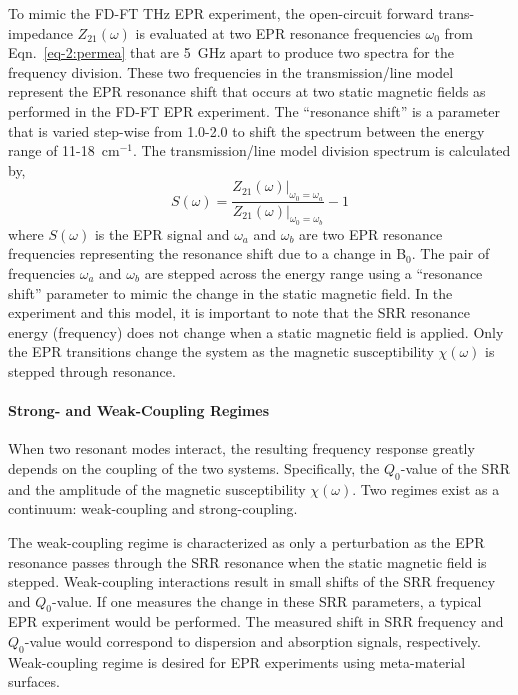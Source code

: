 To mimic the FD-FT THz EPR experiment, the open-circuit forward trans-impedance $Z_{21}(\omega)$ is evaluated at two EPR resonance frequencies $\omega_0$ from Eqn.~\ref{eq-2:permea} that are 5~GHz apart to produce two spectra for the frequency division. These two frequencies in the transmission\-/line model represent the EPR resonance shift that occurs at two static magnetic fields as performed in the FD-FT EPR experiment. The ``resonance shift'' is a parameter that is varied step-wise from 1.0-2.0 to shift the spectrum between the energy range of 11-18~cm$^{-1}$. The transmission\-/line model division spectrum is calculated by, 
\begin{equation}
    S(\omega) = \frac{Z_{21}(\omega)\Bigr\rvert_{\omega_0 = \omega_a}}{Z_{21}(\omega)\Bigr\rvert_{\omega_0 = \omega_b}} - 1
\end{equation}
where $S(\omega)$ is the EPR signal and $\omega_a$ and $\omega_b$ are two EPR resonance frequencies representing the resonance shift due to a change in B$_0$. The pair of frequencies $\omega_a$ and $\omega_b$ are stepped across the energy range using a ``resonance shift'' parameter to mimic the change in the static magnetic field. In the experiment and this model, it is important to note that the SRR resonance energy (frequency) does not change when a static magnetic field is applied. Only the EPR transitions change the system as the magnetic susceptibility $\chi(\omega)$ is stepped through resonance.

\noindent \paragraph*{Strong- and Weak-Coupling Regimes}
When two resonant modes interact, the resulting frequency response greatly depends on the coupling of the two systems. Specifically, the $Q_0$-value of the SRR and the amplitude of the magnetic susceptibility $\chi(\omega)$. Two regimes exist as a continuum: weak-coupling and strong-coupling. 

The weak-coupling regime is characterized as only a perturbation as the EPR resonance passes through the SRR resonance when the static magnetic field is stepped. Weak-coupling interactions result in small shifts of the SRR frequency and $Q_0$-value. If one measures the change in these SRR parameters, a typical EPR experiment would be performed. The measured shift in SRR frequency and $Q_0$-value would correspond to dispersion and absorption signals, respectively. \cite{abragam1961, poole} Weak-coupling regime is desired for EPR experiments using meta-material surfaces.

